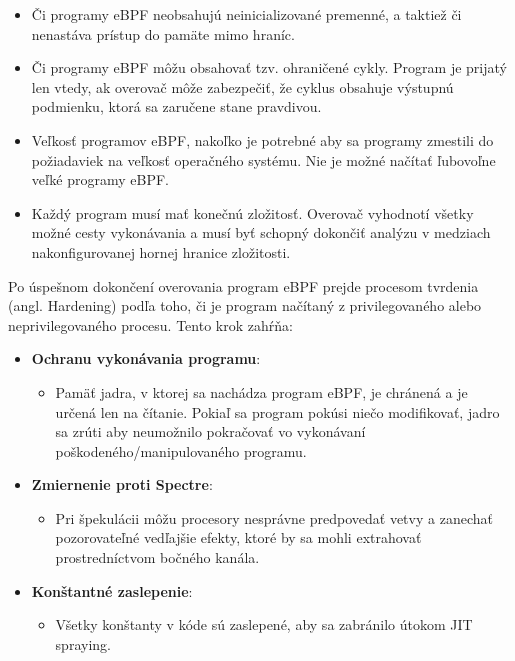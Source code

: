\begin{itemize}
    \item Či programy eBPF neobsahujú neinicializované premenné, a taktiež či nenastáva prístup do pamäte mimo hraníc.
    \item Či programy eBPF môžu obsahovať tzv. ohraničené cykly. Program je prijatý len vtedy, ak overovač môže zabezpečiť, 
    že cyklus obsahuje výstupnú podmienku, ktorá sa zaručene stane pravdivou.
    \item Veľkosť programov eBPF, nakoľko je potrebné aby sa programy zmestili do požiadaviek na veľkosť operačného systému. 
    Nie je možné načítať ľubovoľne veľké programy eBPF.
    \item Každý program musí mať konečnú zložitosť. Overovač vyhodnotí všetky možné cesty vykonávania a musí byť schopný dokončiť analýzu 
    v medziach nakonfigurovanej hornej hranice zložitosti.
\end{itemize}

Po úspešnom dokončení overovania program eBPF prejde procesom tvrdenia (angl. Hardening) podľa toho, či je program načítaný z 
privilegovaného alebo neprivilegovaného procesu. 
Tento krok zahŕňa:
\begin{itemize}
    \item \textbf{Ochranu vykonávania programu}: 
        \begin{itemize}
            \item Pamäť jadra, v ktorej sa nachádza program eBPF, je chránená a je určená len na čítanie. 
            Pokiaľ sa program pokúsi niečo modifikovať, jadro sa zrúti aby neumožnilo pokračovať vo vykonávaní poškodeného/manipulovaného programu.
        \end{itemize}
    \item \textbf{Zmiernenie proti Spectre}: 
        \begin{itemize}
            \item Pri špekulácii môžu procesory nesprávne predpovedať vetvy a zanechať pozorovateľné vedľajšie efekty, 
            ktoré by sa mohli extrahovať prostredníctvom bočného kanála.
        \end{itemize}
    \item \textbf{Konštantné zaslepenie}: 
        \begin{itemize}
            \item Všetky konštanty v kóde sú zaslepené, aby sa zabránilo útokom JIT spraying.~\cite{eBPF}
        \end{itemize}
\end{itemize}

